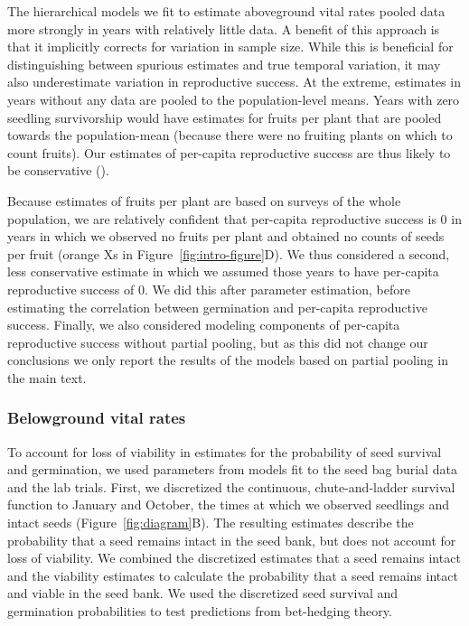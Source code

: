 \documentclass[12pt, oneside, titlepage]{article}   	%
\begin{document}
The hierarchical models we fit to estimate aboveground vital rates pooled data more strongly in years with relatively little data. A benefit of this approach is that it implicitly corrects for variation in sample size. While this is beneficial for distinguishing between spurious estimates and true temporal variation, it may also underestimate variation in reproductive success. At the extreme, estimates in years without any data are pooled to the population-level means. Years with zero seedling survivorship would have estimates for fruits per plant that are pooled towards the population-mean (because there were no fruiting plants on which to count fruits). Our estimates of per-capita reproductive success are thus likely to be conservative (\cite{evans2007}). 

Because estimates of fruits per plant are based on surveys of the whole population, we are relatively confident that per-capita reproductive success is 0 in years in which we observed no fruits per plant and obtained no counts of seeds per fruit (orange Xs in Figure~\ref{fig:intro-figure}D). We thus considered a second, less conservative estimate in which we assumed those years to have per-capita reproductive success of 0. We did this after parameter estimation, before estimating the correlation between germination and per-capita reproductive success. Finally, we also considered modeling components of per-capita reproductive success without partial pooling, but as this did not change our conclusions we only report the results of the models based on partial pooling in the main text.  

\subsubsection{Belowground vital rates}

To account for loss of viability in estimates for the probability of seed survival and germination, we used parameters from models fit to the seed bag burial data and the lab trials. First, we discretized the continuous, chute-and-ladder survival function to January and October, the times at which we observed seedlings and intact seeds (Figure~\ref{fig:diagram}B). The resulting estimates describe the probability that a seed remains intact in the seed bank, but does not account for loss of viability. We combined the discretized estimates that a seed remains intact and the viability estimates to calculate the probability that a seed remains intact and viable in the seed bank. We used the discretized seed survival and germination probabilities to test predictions from bet-hedging theory. 
\end{document}
